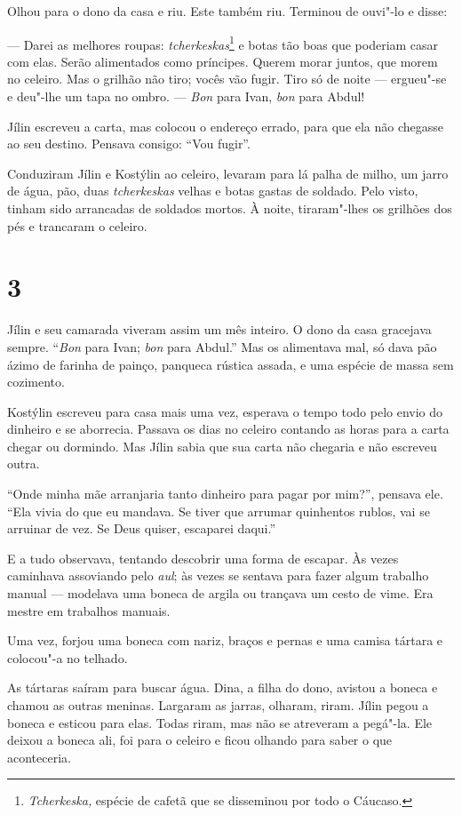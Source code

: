 Olhou para o dono da casa e riu. Este também riu. Terminou de ouvi"-lo e
disse:

--- Darei as melhores roupas: \emph{tcherkeskas}\footnote{\emph{Tcherkeska,}
  espécie de cafetã que se disseminou por todo o Cáucaso.} e botas tão
boas que poderiam casar com elas. Serão alimentados como príncipes.
Querem morar juntos, que morem no celeiro. Mas o grilhão não tiro; vocês
vão fugir. Tiro só de noite --- ergueu"-se e deu"-lhe um tapa no ombro. ---
\emph{Bon} para Ivan, \emph{bon} para Abdul!

Jílin escreveu a carta, mas colocou o endereço errado, para que ela não
chegasse ao seu destino. Pensava consigo: ``Vou fugir''.

Conduziram Jílin e Kostýlin ao celeiro, levaram para lá palha de milho,
um jarro de água, pão, duas \emph{tcherkeskas} velhas e botas gastas de
soldado. Pelo visto, tinham sido arrancadas de soldados mortos. À noite,
tiraram"-lhes os grilhões dos pés e trancaram o celeiro.

\section{3}

Jílin e seu camarada viveram assim um mês inteiro. O dono da casa
gracejava sempre. ``\emph{Bon} para Ivan; \emph{bon} para Abdul.'' Mas
os alimentava mal, só dava pão ázimo de farinha de painço, panqueca
rústica assada, e uma espécie de massa sem cozimento.

Kostýlin escreveu para casa mais uma vez, esperava o tempo todo pelo
envio do dinheiro e se aborrecia. Passava os dias no celeiro contando as
horas para a carta chegar ou dormindo. Mas Jílin sabia que sua carta não
chegaria e não escreveu outra.

``Onde minha mãe arranjaria tanto dinheiro para pagar por mim?'',
pensava ele. ``Ela vivia do que eu mandava. Se tiver que arrumar
quinhentos rublos, vai se arruinar de vez. Se Deus quiser, escaparei
daqui.''

E a tudo observava, tentando descobrir uma forma de escapar. Às vezes
caminhava assoviando pelo \emph{aul}; às vezes se sentava para fazer
algum trabalho manual --- modelava uma boneca de argila ou trançava um
cesto de vime. Era mestre em trabalhos manuais.

Uma vez, forjou uma boneca com nariz, braços e pernas e uma camisa
tártara e colocou"-a no telhado.

As tártaras saíram para buscar água. Dina, a filha do dono, avistou a
boneca e chamou as outras meninas. Largaram as jarras, olharam, riram.
Jílin pegou a boneca e esticou para elas. Todas riram, mas não se
atreveram a pegá"-la. Ele deixou a boneca ali, foi para o celeiro e ficou
olhando para saber o que aconteceria.


